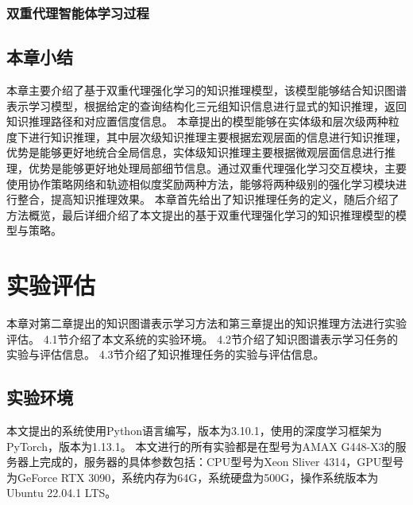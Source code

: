 \documentclass[algorithmlist, AutoFakeBold, AutoFakeSlant, figurelist, tablelist, nomlist, masters]{seuthesix}
\begin{document}
\subsection{双重代理智能体学习过程}


\section{本章小结}
本章主要介绍了基于双重代理强化学习的知识推理模型，该模型能够结合知识图谱表示学习模型，根据给定的查询结构化三元组知识信息进行显式的知识推理，返回知识推理路径和对应置信度信息。
本章提出的模型能够在实体级和层次级两种粒度下进行知识推理，其中层次级知识推理主要根据宏观层面的信息进行知识推理，优势是能够更好地统合全局信息，实体级知识推理主要根据微观层面信息进行推理，优势是能够更好地处理局部细节信息。通过双重代理强化学习交互模块，主要使用协作策略网络和轨迹相似度奖励两种方法，能够将两种级别的强化学习模块进行整合，提高知识推理效果。
本章首先给出了知识推理任务的定义，随后介绍了方法概览，最后详细介绍了本文提出的基于双重代理强化学习的知识推理模型的模型与策略。


\chapter{实验评估}
本章对第二章提出的知识图谱表示学习方法和第三章提出的知识推理方法进行实验评估。
4.1节介绍了本文系统的实验环境。
4.2节介绍了知识图谱表示学习任务的实验与评估信息。
4.3节介绍了知识推理任务的实验与评估信息。

\section{实验环境}
本文提出的系统使用Python语言编写，版本为3.10.1，使用的深度学习框架为PyTorch，版本为1.13.1。
本文进行的所有实验都是在型号为AMAX G448-X3的服务器上完成的，服务器的具体参数包括：CPU型号为Xeon Sliver 4314，GPU型号为GeForce RTX 3090，系统内存为64G，系统硬盘为500G，操作系统版本为Ubuntu 22.04.1 LTS。
\end{document}

